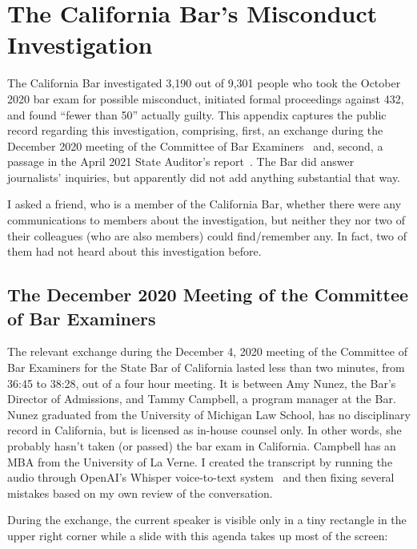 
\newpage
\section{The California Bar's Misconduct Investigation}
\label{adx:barexam:record}

The California Bar investigated 3,190 out of 9,301 people who took the October
2020 bar exam for possible misconduct, initiated formal proceedings against 432,
and found ``fewer than 50'' actually guilty. This appendix captures the public
record regarding this investigation, comprising, first, an exchange during the
December 2020 meeting of the Committee of Bar
Examiners~\cite{CommitteeOfBarExaminers2020} and, second, a passage in the April
2021 State Auditor's report~\cite{Howle2021}. The Bar did answer journalists'
inquiries, but apparently did not add anything substantial that way.

I asked a friend, who is a member of the California Bar, whether there were any
communications to members about the investigation, but neither they nor two of
their colleagues (who are also members) could find/remember any. In fact, two of
them had not heard about this investigation before.


\subsection{The December 2020 Meeting of the Committee of Bar Examiners}
\label{adx:barexam:meeting}

The relevant exchange during the December 4, 2020 meeting of the Committee of
Bar Examiners for the State Bar of California lasted less than two minutes, from
36:45 to 38:28, out of a four hour meeting. It is between Amy Nunez, the Bar's
Director of Admissions, and Tammy Campbell, a program manager at the Bar. Nunez
graduated from the University of Michigan Law School, has no disciplinary record
in California, but is licensed as in-house counsel only. In other words, she
probably hasn't taken (or passed) the bar exam in California. Campbell has an
MBA from the University of La Verne. I created the transcript by running the
audio through OpenAI's Whisper voice-to-text system~\cite{RadfordKimea2022} and
then fixing several mistakes based on my own review of the conversation.

During the exchange, the current speaker is visible only in a tiny rectangle in
the upper right corner while a slide with this agenda takes up most of the
screen:


